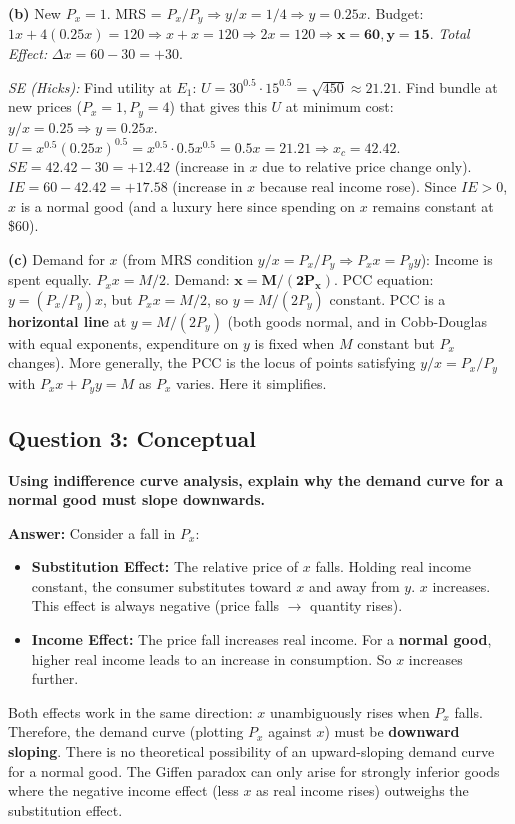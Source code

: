 \documentclass[10pt,a4paper]{article}
\begin{document}
\begin{multicols}{2}
\textbf{(b)} New $P_x = 1$. MRS = $P_x/P_y \Rightarrow y/x = 1/4 \Rightarrow y = 0.25x$.
Budget: $1x + 4(0.25x) = 120 \Rightarrow x + x = 120 \Rightarrow 2x=120 \Rightarrow \mathbf{x=60, y=15}$.
\textit{Total Effect:} $\Delta x = 60 - 30 = +30$.

\textit{SE (Hicks):} Find utility at $E_1$: $U = 30^{0.5} \cdot 15^{0.5} = \sqrt{450} \approx 21.21$. Find bundle at new prices ($P_x=1, P_y=4$) that gives this $U$ at minimum cost: $y/x = 0.25 \Rightarrow y=0.25x$. $U = x^{0.5}(0.25x)^{0.5} = x^{0.5} \cdot 0.5 x^{0.5} = 0.5x = 21.21 \Rightarrow x_c = 42.42$.
$SE = 42.42 - 30 = +12.42$ (increase in $x$ due to relative price change only).
$IE = 60 - 42.42 = +17.58$ (increase in $x$ because real income rose).
Since $IE > 0$, $x$ is a normal good (and a luxury here since spending on $x$ remains constant at \$60).

\textbf{(c)} Demand for $x$ (from MRS condition $y/x = P_x/P_y \Rightarrow P_x x = P_y y$): Income is spent equally. $P_x x = M/2$. Demand: $\mathbf{x = M/(2P_x)}$. PCC equation: $y = (P_x/P_y) x$, but $P_x x = M/2$, so $y = M/(2P_y)$ constant. PCC is a \textbf{horizontal line} at $y = M/(2P_y)$ (both goods normal, and in Cobb-Douglas with equal exponents, expenditure on $y$ is fixed when $M$ constant but $P_x$ changes). More generally, the PCC is the locus of points satisfying $y/x = P_x/P_y$ with $P_x x + P_y y = M$ as $P_x$ varies. Here it simplifies.

\vspace{0.2cm}

\subsection*{Question 3: Conceptual}
\textbf{Using indifference curve analysis, explain why the demand curve for a normal good must slope downwards.}

\textbf{Answer:} Consider a fall in $P_x$:
\begin{itemize}[leftmargin=*,nosep]
    \item \textbf{Substitution Effect:} The relative price of $x$ falls. Holding real income constant, the consumer substitutes toward $x$ and away from $y$. $x$ increases. This effect is always negative (price falls $\to$ quantity rises).
    \item \textbf{Income Effect:} The price fall increases real income. For a \textbf{normal good}, higher real income leads to an increase in consumption. So $x$ increases further.
\end{itemize}
Both effects work in the same direction: $x$ unambiguously rises when $P_x$ falls. Therefore, the demand curve (plotting $P_x$ against $x$) must be \textbf{downward sloping}. There is no theoretical possibility of an upward-sloping demand curve for a normal good. The Giffen paradox can only arise for strongly inferior goods where the negative income effect (less $x$ as real income rises) outweighs the substitution effect.


\end{multicols}
\end{document}
